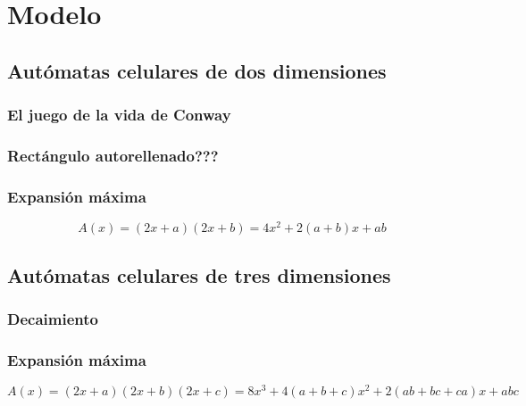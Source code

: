\section{Modelo}
\label{sec:modelo}

\subsection{Autómatas celulares de dos dimensiones}

\subsubsection{El juego de la vida de Conway}

\subsubsection{Rectángulo autorellenado???}

\subsubsection{Expansión máxima}
\begin{equation}
    A(x) = (2x+a) (2x+b) = 4x^2 + 2 (a+b) x + ab
\end{equation}

\subsection{Autómatas celulares de tres dimensiones}

\subsubsection{Decaimiento}

\subsubsection{}

\subsubsection{Expansión máxima}
\begin{equation}
    A(x) = (2x+a) (2x+b) (2x+c) = 8x^3 + 4 (a+b+c) x^2 + 2 (ab+bc+ca) x + abc
\end{equation}

